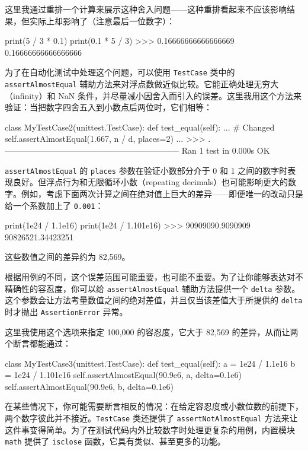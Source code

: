 这里我通过重排一个计算来展示这种舍入问题——这种重排看起来不应该影响结果，但实际上却影响了（注意最后一位数字）：

\begin{codebox}[python]
print(5 / 3 * 0.1)
print(0.1 * 5 / 3)
>>>
0.16666666666666669
0.16666666666666666
\end{codebox}

为了在自动化测试中处理这个问题，可以使用 \texttt{TestCase} 类中的 \texttt{assertAlmostEqual} 辅助方法来对浮点数做近似比较。它能正确处理无穷大（infinity）和 NaN 条件，并尽量减小因舍入而引入的误差。这里我用这个方法来验证：当把数字四舍五入到小数点后两位时，它们相等：

\begin{codebox}[python]
class MyTestCase2(unittest.TestCase):
    def test_equal(self):
        ...
        # Changed
        self.assertAlmostEqual(1.667, n / d, places=2)
...
>>>
.
---------------------------------------------------------------
Ran 1 test in 0.000s
OK
\end{codebox}

\texttt{assertAlmostEqual} 的 \texttt{places} 参数在验证小数部分介于 0 和 1 之间的数字时表现良好。但浮点行为和无限循环小数（repeating decimals）也可能影响更大的数字。例如，考虑下面两次计算之间在绝对值上巨大的差异——即便唯一的改动只是给一个系数加上了 \texttt{0.001}：

\begin{codebox}[python]
print(1e24 / 1.1e16)
print(1e24 / 1.101e16)
>>>
90909090.9090909
90826521.34423251
\end{codebox}

这些数值之间的差异约为 82,569。

根据用例的不同，这个误差范围可能重要，也可能不重要。为了让你能够表达对不精确性的容忍度，你可以给 \texttt{assertAlmostEqual} 辅助方法提供一个 \texttt{delta} 参数。这个参数会让方法考量数值之间的绝对差值，并且仅当该差值大于所提供的 \texttt{delta} 时才抛出 \texttt{AssertionError} 异常。

这里我使用这个选项来指定 100,000 的容忍度，它大于 82,569 的差异，从而让两个断言都能通过：

\begin{codebox}[python]
class MyTestCase3(unittest.TestCase):
    def test_equal(self):
        a = 1e24 / 1.1e16
        b = 1e24 / 1.101e16
        self.assertAlmostEqual(90.9e6, a, delta=0.1e6)
        self.assertAlmostEqual(90.9e6, b, delta=0.1e6)
\end{codebox}

在某些情况下，你可能需要断言相反的情况：在给定容忍度或小数位数的前提下，两个数字彼此并不接近。\texttt{TestCase} 类还提供了 \texttt{assertNotAlmostEqual} 方法来让这件事变得简单。为了在测试代码内外比较数字时处理更复杂的用例，内置模块 \texttt{math} 提供了 \texttt{isclose} 函数，它具有类似、甚至更多的功能。

